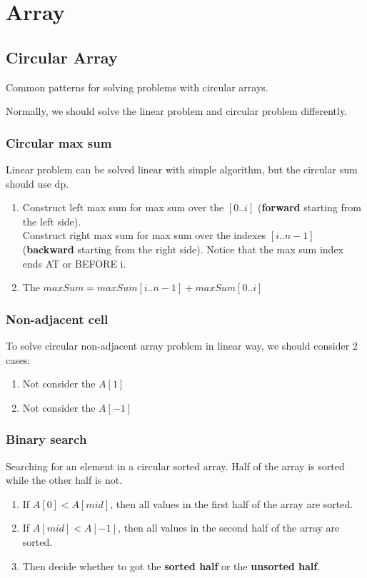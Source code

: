 \chapter{Array}
\section{Circular Array}
Common patterns for solving problems with circular arrays.

Normally, we should solve the linear problem and circular problem differently.

\subsection{Circular max sum}
Linear problem can be solved linear with simple algorithm, but the circular sum should use dp. 
\begin{enumerate}
\item Construct left max sum for max sum over the $[0..i]$ (\textbf{forward} starting from the left side). \\ Construct right max sum for max sum over the indexes $[i..n-1]$ (\textbf{backward} starting from the right side). Notice that the max sum index ends AT or BEFORE i. 
\item The $maxSum = maxSum[i..n-1]+maxSum[0..i]$
\end{enumerate}

\subsection{Non-adjacent cell}
To solve circular non-adjacent array problem in linear way, we should consider 2 cases:
\begin{enumerate}
\item Not consider the $A[1]$
\item Not consider the $A[-1]$ 
\end{enumerate}

\subsection{Binary search}
Searching for an element in a circular sorted array. Half of the array is sorted while the other half is not.
\begin{enumerate}
\item If $A[0] < A[mid]$, then all values in the first half of the array are sorted.
\item If $A[mid] < A[-1]$, then all values in the second half of the array are sorted.
\item Then decide whether to got the \textbf{sorted half} or the \textbf{unsorted half}.
\end{enumerate}
